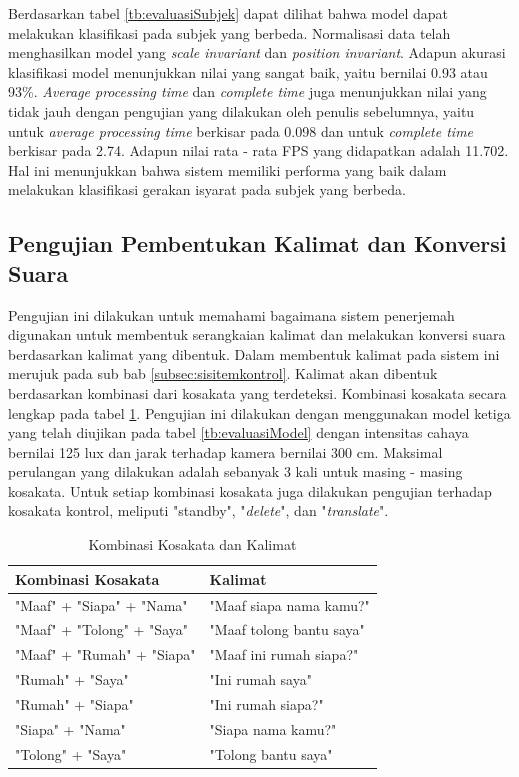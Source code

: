 Berdasarkan tabel \ref{tb:evaluasiSubjek} dapat dilihat bahwa model dapat melakukan klasifikasi pada subjek yang berbeda. Normalisasi data telah menghasilkan model yang \emph{scale invariant} dan \emph{position invariant}. Adapun akurasi klasifikasi model menunjukkan nilai yang sangat baik, yaitu bernilai 0.93 atau 93\%. \emph{Average processing time} dan \emph{complete time} juga menunjukkan nilai yang tidak jauh dengan pengujian yang dilakukan oleh penulis sebelumnya, yaitu untuk \emph{average processing time} berkisar pada 0.098 dan untuk \emph{complete time} berkisar pada 2.74. Adapun nilai rata - rata FPS yang didapatkan adalah 11.702. Hal ini menunjukkan bahwa sistem memiliki performa yang baik dalam melakukan klasifikasi gerakan isyarat pada subjek yang berbeda.

\subsection{Pengujian Pembentukan Kalimat dan Konversi Suara}
\label{sec:analisiskalimat}

Pengujian ini dilakukan untuk memahami bagaimana sistem penerjemah digunakan untuk membentuk serangkaian kalimat dan melakukan konversi suara berdasarkan kalimat yang dibentuk. Dalam membentuk kalimat pada sistem ini merujuk pada sub bab \ref{subsec:sisitemkontrol}. Kalimat akan dibentuk berdasarkan kombinasi dari kosakata yang terdeteksi. Kombinasi kosakata secara lengkap pada tabel \ref{tb:kombinasiKosakata}. Pengujian ini dilakukan dengan menggunakan model ketiga yang telah diujikan pada tabel \ref{tb:evaluasiModel} dengan intensitas cahaya bernilai 125 lux dan jarak terhadap kamera bernilai 300 cm. Maksimal perulangan yang dilakukan adalah sebanyak 3 kali untuk masing - masing kosakata. Untuk setiap kombinasi kosakata juga dilakukan pengujian terhadap kosakata kontrol, meliputi "standby", "\emph{delete}", dan "\emph{translate}".

\begin{table}[H]
  \caption{Kombinasi Kosakata dan Kalimat}
  \label{tb:kombinasiKosakata}
  \centering
  \begin{tabular}{ll}
    \hline
    \textbf{Kombinasi Kosakata} & \textbf{Kalimat} \\
    \hline
    "Maaf" + "Siapa" + "Nama" & "Maaf siapa nama kamu?" \\
    "Maaf" + "Tolong" + "Saya" & "Maaf tolong bantu saya" \\
    "Maaf" + "Rumah" + "Siapa" & "Maaf ini rumah siapa?" \\
    "Rumah" + "Saya" & "Ini rumah saya" \\
    "Rumah" + "Siapa" & "Ini rumah siapa?" \\
    "Siapa" + "Nama" & "Siapa nama kamu?" \\
    "Tolong" + "Saya" & "Tolong bantu saya" \\
    \hline
  \end{tabular}
\end{table}


